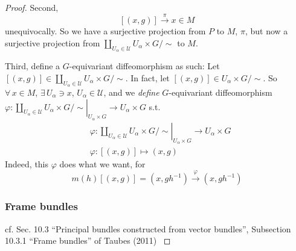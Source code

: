 \documentclass[10pt]{amsart}
\begin{document}
\begin{multicols*}{2}
\begin{proof}
Second, 
\[
[(x,g)] \xrightarrow{ \pi} x\in M
\]
unequivocally.  So we have a surjective projection from $P$ to $M$, $\pi$, but now a surjective projection from $\coprod_{U_{\alpha} \in \mathcal{U}} U_{\alpha}\times G/\sim$ to $M$.



Third, define a $G$-equivariant diffeomorphism as such: Let $[(x,g)] \in \coprod_{U_{\alpha} \in \mathcal{U}} U_{\alpha}\times G/\sim$.  In fact, let $[(x,g)] \in U_{\alpha}\times G/\sim$.  So $\forall \, x \in M$, $\exists \, U_{\alpha} \ni x$, $U_{\alpha} \in \mathcal{U}$, and we \emph{define} $G$-equivariant diffeomorphism $\varphi : \left. \coprod_{U_{\alpha} \in \mathcal{U}} U_{\alpha}\times G/\sim \right|_{U_{\alpha}\times G} \to U_{\alpha}\times G$ s.t.
\begin{equation}
  \begin{aligned}
&    \varphi : \left. \coprod_{U_{\alpha} \in \mathcal{U}} U_{\alpha}\times G/\sim \right|_{U_{\alpha}\times G} \to U_{\alpha}\times G \\
& \varphi : [(x,g)] \mapsto (x,g)
  \end{aligned}
\end{equation}
Indeed, this $\varphi$ does what we want, for 
\[
m(h)[(x,g)] = (x,gh^{-1}) \xrightarrow{\varphi} (x,gh^{-1})
\]

\subsubsection{Frame bundles}

cf. Sec. 10.3 ``Principal bundles constructed from vector bundles'', Subsection 10.3.1 ``Frame bundles'' of Taubes (2011) \cite{CTaubes2011}


\end{proof}
\end{multicols*}
\end{document}
